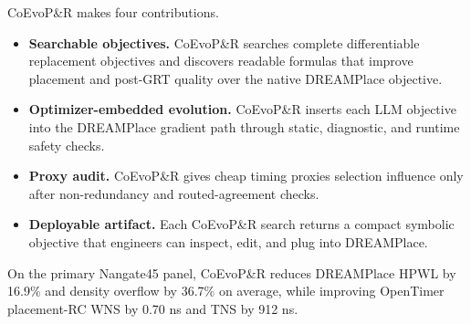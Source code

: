 CoEvoP\&R makes four contributions.
\begin{itemize}
  \item \textbf{Searchable objectives.} CoEvoP\&R searches complete
  differentiable replacement objectives and discovers readable formulas that
  improve placement and post-GRT quality over the native DREAMPlace objective.
  \item \textbf{Optimizer-embedded evolution.} CoEvoP\&R inserts each LLM
  objective into the DREAMPlace gradient path through static, diagnostic, and
  runtime safety checks.
  \item \textbf{Proxy audit.} CoEvoP\&R gives cheap timing proxies
  selection influence only after non-redundancy and routed-agreement checks.
  \item \textbf{Deployable artifact.} Each CoEvoP\&R search returns a compact
  symbolic objective that engineers can inspect, edit, and plug into DREAMPlace.
\end{itemize}

On the primary Nangate45 panel, CoEvoP\&R reduces DREAMPlace HPWL by 16.9\%
and density overflow by 36.7\% on average, while improving OpenTimer
placement-RC WNS by 0.70 ns and TNS by 912 ns.
